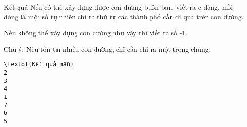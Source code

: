 Kết quả  
Nếu có thể xây dựng được con đường buôn bán, viết ra c dòng, mỗi dòng là một số tự nhiên chỉ ra thứ tự các thành phố cần đi qua trên con đường.  

   Nếu không thể xây dựng con đường như vậy thì viết ra số -1.  

   Chú ý: Nếu tồn tại nhiều con đường, chỉ cần chỉ ra một trong chúng.  
\begin{verbatim}
\textbf{Kết quả mẫu}
2
3
4
1
7
6
5
\end{verbatim}
